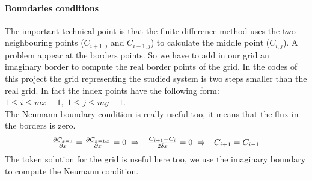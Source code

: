 \documentclass[a4paper,11pt]{report}
\begin{document}
\paragraph{Boundaries conditions}
The important technical point is that the finite difference method uses the two neighbouring points ($C_{i+1,j}$ and $C_{i-1,j}$) to calculate the middle point ($C_{i,j}$). A problem appear at the borders points. So we have to add in our grid an imaginary border to compute the real border points of the grid. In the codes of this project the grid representing the studied system is two steps smaller than the real grid. In fact the index points have the following form: $1\leq i\leq mx-1,\; 1\leq j\leq my-1$. \\
The Neumann boundary condition is really useful too, it means that the flux in the borders is zero.
$$
\begin{array}{l c r}
\frac{\partial C _{x= 0 }}{\partial x}= \frac{\partial C _{x= Lx }}{\partial x} =0 \; \Rightarrow & \frac{C_{i+1}-C_{i}}{2\delta x}=0 \; \Rightarrow & C_{i+1}=C_{i-1}
\end{array}
$$
The token solution for the grid is useful here too, we use the imaginary boundary to compute the Neumann condition. 
\end{document}
